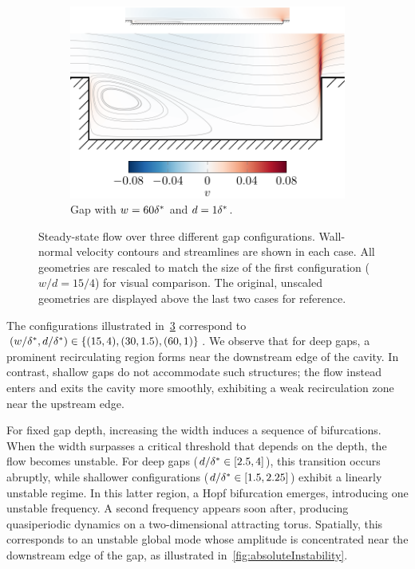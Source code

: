 \documentclass[../main.tex]{subfiles}
\begin{document}
\begin{figure}[ht]
\begin{subfigure}[b]{0.49\textwidth}
		\label{fig:gapd15w30}
	\end{subfigure}
	\hfill
	\begin{subfigure}[b]{0.49\textwidth}
		\centering
		\includegraphics[width=\textwidth]{../../Images/gapd1_w60.pdf}
		\caption{Gap with $w=60{\delta^*}$ and $d=1{\delta^*}$.}
		\label{fig:gapd1w60}
	\end{subfigure}
	\caption{Steady-state flow over three different gap configurations. Wall-normal velocity contours and streamlines are shown in each case. All geometries are rescaled to match the size of the first configuration ($w/d = 15/4$) for visual comparison. The original, unscaled geometries are displayed above the last two cases for reference.}
	\label{fig:stableSS}
\end{figure}

The configurations illustrated in~\cref{fig:stableSS} correspond to $(w/{\delta^*}, d/{\delta^*}) \in \{(15,4), (30,1.5), (60,1)\}$. We observe that for deep gaps, a prominent recirculating region forms near the downstream edge of the cavity. In contrast, shallow gaps do not accommodate such structures; the flow instead enters and exits the cavity more smoothly, exhibiting a weak recirculation zone near the upstream edge.

For fixed gap depth, increasing the width induces a sequence of bifurcations. When the width surpasses a critical threshold that depends on the depth, the flow becomes unstable. For deep gaps ($d/{\delta^*} \in [2.5, 4]$), this transition occurs abruptly, while shallower configurations ($d/{\delta^*} \in [1.5, 2.25]$) exhibit a linearly unstable regime. In this latter region, a Hopf bifurcation emerges, introducing one unstable frequency. A second frequency appears soon after, producing quasiperiodic dynamics on a two-dimensional attracting torus. Spatially, this corresponds to an unstable global mode whose amplitude is concentrated near the downstream edge of the gap, as illustrated in~\cref{fig:absoluteInstability}.
\end{document}
